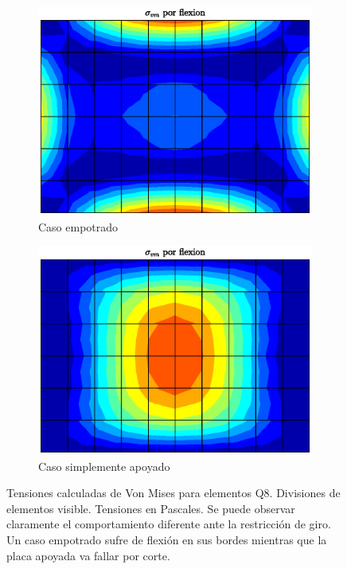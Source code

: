 \documentclass[onecolumn,10pt,titlepage]{article}
\begin{document}
 \begin{figure}[htb!]
 \centering
 \begin{subfigure}{0.49\textwidth}
 \includegraphics[width=\linewidth]{fig/VM.eps}
 \caption{Caso empotrado}
 \label{fig:VMempotrado}
 \end{subfigure}
 \begin{subfigure}{0.49\textwidth}
 \includegraphics[width=\linewidth]{fig/VMapoyado.eps}
 \caption{Caso simplemente apoyado}
 \label{fig:VMapoyado}
 \end{subfigure}
 \caption{Tensiones calculadas de Von Mises para elementos Q8. Divisiones de elementos visible. Tensiones en Pascales. Se puede observar claramente el comportamiento diferente ante la restricción de giro. Un caso empotrado sufre de flexión en sus bordes mientras que la placa apoyada va fallar por corte.}
 \label{fig:VM}
 \end{figure}
\end{document}
